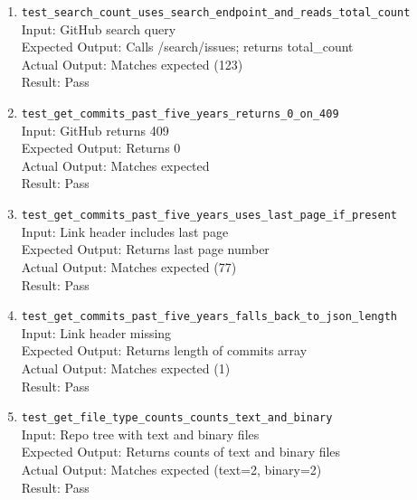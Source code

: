 \documentclass[12pt, titlepage]{article}
\begin{document}
\begin{enumerate}
      \\Result: Pass
    \item \texttt{test\_search\_count\_uses\_search\_endpoint\_and\_reads\_total\_count} \label{test-search-count-uses-search-endpoint-and-reads-total-count}
      \\Input: GitHub search query
      \\Expected Output: Calls /search/issues; returns total\_count
      \\Actual Output: Matches expected (123)
      \\Result: Pass
    \item \texttt{test\_get\_commits\_past\_five\_years\_returns\_0\_on\_409} \label{test-get-commits-past-five-years-returns-0-on-409}
      \\Input: GitHub returns 409
      \\Expected Output: Returns 0
      \\Actual Output: Matches expected
      \\Result: Pass
    \item \texttt{test\_get\_commits\_past\_five\_years\_uses\_last\_page\_if\_present} \label{test-get-commits-past-five-years-uses-last-page-if-present}
      \\Input: Link header includes last page
      \\Expected Output: Returns last page number
      \\Actual Output: Matches expected (77)
      \\Result: Pass
    \item \texttt{test\_get\_commits\_past\_five\_years\_falls\_back\_to\_json\_length} \label{test-get-commits-past-five-years-falls-back-to-json-length}
      \\Input: Link header missing
      \\Expected Output: Returns length of commits array
      \\Actual Output: Matches expected (1)
      \\Result: Pass
    \item \texttt{test\_get\_file\_type\_counts\_counts\_text\_and\_binary} \label{test-get-file-type-counts-counts-text-and-binary}
      \\Input: Repo tree with text and binary files
      \\Expected Output: Returns counts of text and binary files
      \\Actual Output: Matches expected (text=2, binary=2)
      \\Result: Pass

\end{enumerate}
\end{document}
